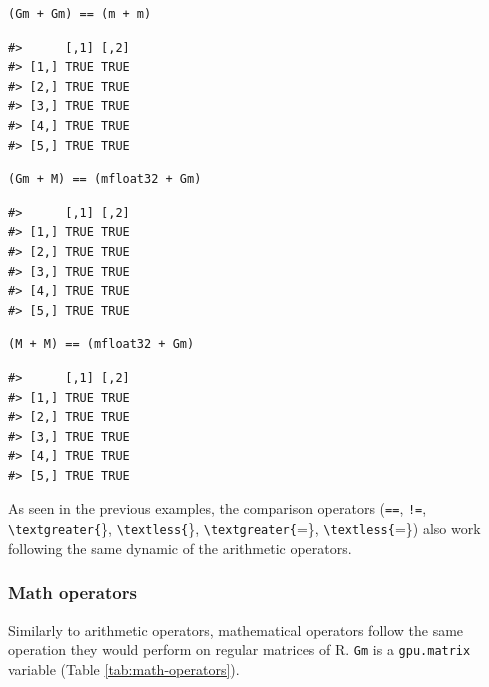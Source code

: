 \begin{verbatim}
(Gm + Gm) == (m + m)
\end{verbatim}

\begin{verbatim}
#>      [,1] [,2]
#> [1,] TRUE TRUE
#> [2,] TRUE TRUE
#> [3,] TRUE TRUE
#> [4,] TRUE TRUE
#> [5,] TRUE TRUE
\end{verbatim}

\begin{verbatim}
(Gm + M) == (mfloat32 + Gm)
\end{verbatim}

\begin{verbatim}
#>      [,1] [,2]
#> [1,] TRUE TRUE
#> [2,] TRUE TRUE
#> [3,] TRUE TRUE
#> [4,] TRUE TRUE
#> [5,] TRUE TRUE
\end{verbatim}

\begin{verbatim}
(M + M) == (mfloat32 + Gm)
\end{verbatim}

\begin{verbatim}
#>      [,1] [,2]
#> [1,] TRUE TRUE
#> [2,] TRUE TRUE
#> [3,] TRUE TRUE
#> [4,] TRUE TRUE
#> [5,] TRUE TRUE
\end{verbatim}

As seen in the previous examples, the comparison operators (\texttt{==}, \texttt{!=}, \texttt{\textbackslash{}textgreater\{}\}, \texttt{\textbackslash{}textless\{}\}, \texttt{\textbackslash{}textgreater\{}=\}, \texttt{\textbackslash{}textless\{}=\}) also work following the same dynamic of the arithmetic operators.

\hypertarget{math-operators}{%
\subsubsection{Math operators}\label{math-operators}}

Similarly to arithmetic operators, mathematical operators follow the same operation they would perform on regular matrices of R. \texttt{Gm} is a \texttt{gpu.matrix} variable (Table \ref{tab:math-operators}).

